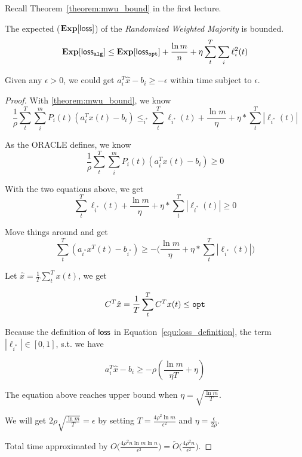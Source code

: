 \documentclass[11pt]{article}
\begin{document}
Recall Theorem~\ref{theorem:mwu_bound} in the first lecture.
\begin{theorem}
\label{theorem:mwu_bound}
The expected ($\mathbf{Exp}[\mathsf{loss}]$) of the \textit{Randomized Weighted Majority} is bounded.
\begin{equation}
\label{equ:mwu_bound}
\mathbf{Exp}[\mathsf{loss}_{{\tt alg}}] \leq \mathbf{Exp}[\mathsf{loss}_{{\tt opt}}] + \frac{\ln{m}}{n} + \eta \sum_t^T\sum_i\ell_i^2(t)
\end{equation}
\end{theorem}

\begin{theorem}
Given any $\epsilon > 0$, we could get $a_i^T \hat{x} - b_i \geq -\epsilon$ within time subject to $\epsilon$.
\end{theorem}

\begin{proof}
With \ref{theorem:mwu_bound}, we know
\[
\frac{1}{\rho}\sum_t^T \sum_i^m P_i(t)(a_i^T x(t) - b_i) \leq_{i^*} \sum_t^T\ell_{i^*}(t) + \frac{\ln{m}}{\eta} + \eta*\sum_t^T|\ell_{i^*}(t)|
\]

As the ORACLE defines, we know
\[
\frac{1}{\rho}\sum_t^T \sum_i^m P_i(t)(a_i^T x(t) - b_i) \geq 0
\]

With the two equations above, we get
\[
\sum_t^T\ell_{i^*}(t) + \frac{\ln{m}}{\eta} + \eta*\sum_t^T|\ell_{i^*}(t)| \geq 0
\]

Move things around and get
\[
\sum_t^T (a_{i^*} x^T(t) - b_{i^*}) \geq - \Big(\frac{\ln{m}}{\eta} + \eta*\sum_t^T|\ell_{i^*}(t)| \Big)
\]

Let $\hat{x} = \frac{1}{T}\sum_t^T x(t)$, we get

\begin{equation}
C^T\hat{x} = \frac{1}{T}\sum_t^T C^T x(t) \leq {\tt opt}
\end{equation}


Because the definition of $\mathsf{loss}$ in Equation~\ref{equ:loss_definition}, the term $|\ell_{i^*}| \in [0, 1]$, s.t. we have

\[
a_{i}^T\hat{x} - b_{i} \geq -\rho (\frac{\ln{m}}{\eta T} + \eta)
\]

The equation above reaches upper bound when $\eta = \sqrt{\frac{\ln{m}}{T}}$.

We will get $2\rho\sqrt{\frac{\ln{m}}{T}} = \epsilon$ by setting $T=\frac{4\rho^2 \ln{m}}{\epsilon^2}$ and $\eta=\frac{\epsilon}{2\rho}$.

Total time approximated by $O\Big( \frac{4 \rho^2 n \ln{m}\ln{n}}{\epsilon^2} \Big) = \tilde{O}\Big( \frac{4 \rho^2 n}{\epsilon^2} \Big)$.

\end{proof}
\end{document}

